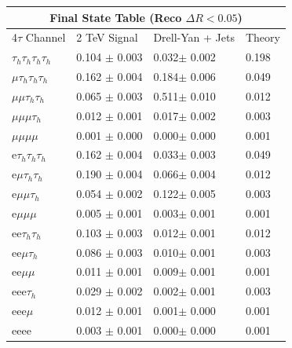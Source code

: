 \documentclass{article}
\begin{document}
 
\begin{landscape} 
\centering 
\begin{tabular}{|p{4.5cm}|p{3cm}|p{3cm}|p{3cm}|}\hline 
\multicolumn{4}{|c|}{Final State Table (Reco \(\Delta R < 0.05\))} \\ 
\hline 
4$\tau$ Channel & 2 TeV Signal & Drell-Yan + Jets & Theory \\ 
\hline 
$\tau_h$$\tau_h$$\tau_h$$\tau_h$ & 0.104 $\pm$ 0.003 & 0.032$\pm$ 0.002 & 0.198\\
\hline 
$\mu$$\tau_h$$\tau_h$$\tau_h$ & 0.162 $\pm$ 0.004 & 0.184$\pm$ 0.006 & 0.049\\
\hline 
$\mu$$\mu$$\tau_h$$\tau_h$ & 0.065 $\pm$ 0.003 & 0.511$\pm$ 0.010 & 0.012\\
\hline 
$\mu$$\mu$$\mu$$\tau_h$ & 0.012 $\pm$ 0.001 & 0.017$\pm$ 0.002 & 0.003\\
\hline 
$\mu$$\mu$$\mu$$\mu$ & 0.001 $\pm$ 0.000 & 0.000$\pm$ 0.000 & 0.001\\
\hline 
e$\tau_h$$\tau_h$$\tau_h$ & 0.162 $\pm$ 0.004 & 0.033$\pm$ 0.003 & 0.049\\
\hline 
e$\mu$$\tau_h$$\tau_h$ & 0.190 $\pm$ 0.004 & 0.066$\pm$ 0.004 & 0.012\\
\hline 
e$\mu$$\mu$$\tau_h$ & 0.054 $\pm$ 0.002 & 0.122$\pm$ 0.005 & 0.003\\
\hline 
e$\mu$$\mu$$\mu$ & 0.005 $\pm$ 0.001 & 0.003$\pm$ 0.001 & 0.001\\
\hline 
ee$\tau_h$$\tau_h$ & 0.103 $\pm$ 0.003 & 0.012$\pm$ 0.001 & 0.012\\
\hline 
ee$\mu$$\tau_h$ & 0.086 $\pm$ 0.003 & 0.010$\pm$ 0.001 & 0.003\\
\hline 
ee$\mu$$\mu$ & 0.011 $\pm$ 0.001 & 0.009$\pm$ 0.001 & 0.001\\
\hline 
eee$\tau_h$ & 0.029 $\pm$ 0.002 & 0.002$\pm$ 0.001 & 0.003\\
\hline 
eee$\mu$ & 0.012 $\pm$ 0.001 & 0.001$\pm$ 0.000 & 0.001\\
\hline 
eeee & 0.003 $\pm$ 0.001 & 0.000$\pm$ 0.000 & 0.001\\
\hline 
\end{tabular} 
\end{landscape} 
\end{document}
